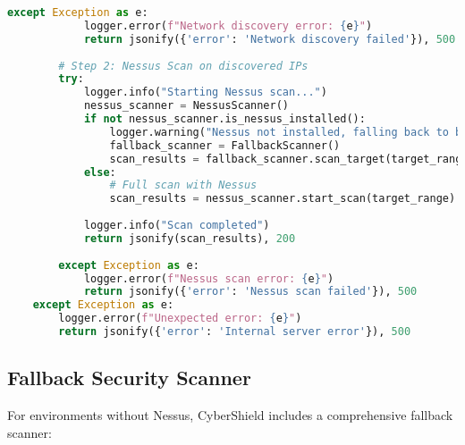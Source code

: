 \documentclass[12pt,a4paper]{report}
\begin{document}
\begin{lstlisting}[language=Python,caption={Full Network Scan with Discovery}]
        except Exception as e:
            logger.error(f"Network discovery error: {e}")
            return jsonify({'error': 'Network discovery failed'}), 500
        
        # Step 2: Nessus Scan on discovered IPs
        try:
            logger.info("Starting Nessus scan...")
            nessus_scanner = NessusScanner()
            if not nessus_scanner.is_nessus_installed():
                logger.warning("Nessus not installed, falling back to basic scan")
                fallback_scanner = FallbackScanner()
                scan_results = fallback_scanner.scan_target(target_range, scan_type='basic')
            else:
                # Full scan with Nessus
                scan_results = nessus_scanner.start_scan(target_range)
            
            logger.info("Scan completed")
            return jsonify(scan_results), 200
            
        except Exception as e:
            logger.error(f"Nessus scan error: {e}")
            return jsonify({'error': 'Nessus scan failed'}), 500
    except Exception as e:
        logger.error(f"Unexpected error: {e}")
        return jsonify({'error': 'Internal server error'}), 500
\end{lstlisting}

\subsection{Fallback Security Scanner}

For environments without Nessus, CyberShield includes a comprehensive fallback scanner:
\end{document}

